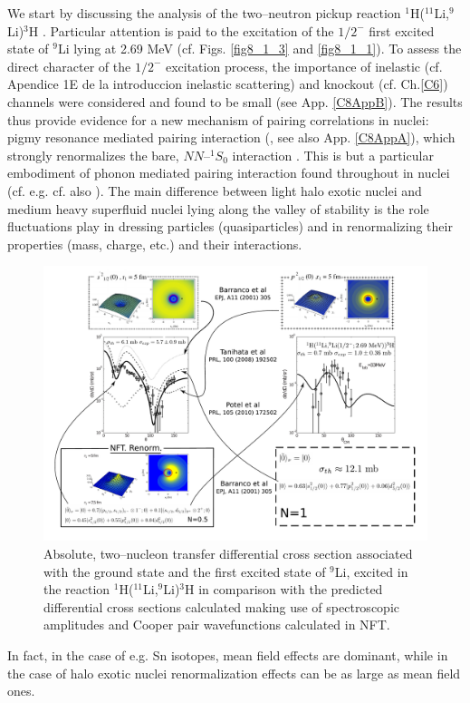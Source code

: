  We start by discussing  the analysis of the two--neutron pickup reaction $^1$H($^{11}$Li,$^9$Li)$^3$H \citep{Tanihata:08}. Particular  attention is paid to the  excitation of the $1/2^-$ first excited state of $^9$Li lying at 2.69 MeV (cf. Figs. \ref{fig8_1_3} and \ref{fig8_1_1}). To assess the direct character of the $1/2^-$ excitation process, the importance of inelastic (cf. Apendice 1E de la introduccion inelastic scattering) and knockout (cf. Ch.\ref{C6}) channels were considered and found to be small (see App. \ref{C8AppB}). The results thus provide evidence for a new mechanism of pairing correlations in nuclei: pigmy resonance mediated pairing interaction (\citet{Barranco:01}, see also App. \ref{C8AppA}), which strongly renormalizes the bare, $NN$--$^1S_0$ interaction \citep{Potel:10}. This is but a particular embodiment of phonon mediated pairing interaction found throughout in nuclei (cf. e.g. \citet{Barranco:99,Gori:04} cf. also \citet{Brink:05}). The main difference between light halo exotic nuclei and medium heavy superfluid nuclei lying along the valley of stability is the role fluctuations play in dressing particles (quasiparticles) and in renormalizing their properties (mass, charge, etc.) and their interactions.
  \begin{figure}
  \centerline{\includegraphics*[width=18cm,angle=0]{C8/figsC8/fig8_1_3}}
  	\caption{Absolute, two--nucleon transfer differential cross section associated with the ground state and the first 	excited state of $^9$Li, excited  in the reaction $^1$H($^{11}$Li,$^9$Li)$^3$H \citep{Tanihata:08} in comparison with the predicted differential cross sections \citep{Potel:10} calculated making use of spectroscopic amplitudes and Cooper pair wavefunctions calculated in NFT.}\label{fig8_1_2}
  \end{figure}
 In fact, in the case of e.g. Sn isotopes, mean field effects are dominant, while in the case of halo exotic nuclei renormalization effects can be as large as mean field ones. 

